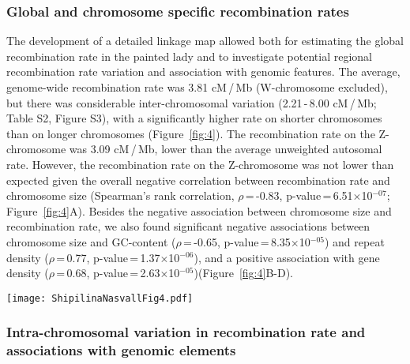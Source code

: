 \documentclass[twocolumn]{bmcart}%
\begin{document}
\subsubsection*{Global and chromosome specific recombination rates}
The development of a detailed linkage map allowed both for estimating the global recombination rate in the painted lady and to investigate potential regional recombination rate variation and association with genomic features. The average, genome-wide recombination rate was 3.81 cM\,/\,Mb (W-chromosome excluded), but there was considerable inter-chromosomal variation (2.21\,-\,8.00 cM\,/\,Mb; Table S2, Figure S3), with a significantly higher rate on shorter chromosomes than on longer chromosomes (Figure~\ref{fig:4}). The recombination rate on the Z-chromosome was 3.09 cM\,/\,Mb, lower than the average unweighted autosomal rate. However, the recombination rate on the Z-chromosome was not lower than expected given the overall negative correlation between recombination rate and chromosome size (Spearman’s rank correlation, $\rho$\,=\,-0.83, p-value\,=\,6.51$\times$10$^{-07}$; Figure~\ref{fig:4}A). Besides the negative association between chromosome size and  recombination rate, we also found significant negative associations between chromosome size and GC-content ($\rho$\,=\,-0.65, p-value\,=\,8.35$\times$10$^{-05}$) and repeat density ($\rho$\,=\,0.77, p-value\,=\,1.37$\times$10$^{-06}$), and a positive association with gene density ($\rho$\,=\,0.68, p-value\,=\,2.63$\times$10$^{-05}$)(Figure~\ref{fig:4}B-D). 

\begin{figure*}[tb]
    \centering
\texttt{[image: ShipilinaNasvallFig4.pdf]}
    \caption{Top row: Associations between chromosome length and A) recombination rate, B) base composition, C) repeat and D) gene proportions. Chromosome length is given in megabases (Mb). Bottom row: Regional distribution of the recombination rate (E), base composition (F), repeat (G) and gene (H) density in 2\,Mb windows along the chromosomes. All chromosomes were analyzed jointly and the x-axis shows the relative position (proportion of chromosomal length) from the center of the chromosomes.}
    \label{fig:4}
\end{figure*}

\subsubsection*{Intra-chromosomal variation in recombination rate and associations with genomic elements}
\end{document}
